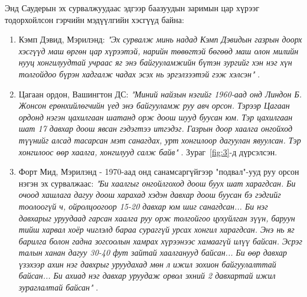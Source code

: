 \documentclass[10pt,twocolumn,letterpaper]{article}
\begin{document}
Энд Саудерын эх сурвалжуудаас эдгээр баазуудын заримын цар хүрээг тодорхойлсон гэрчийн мэдүүлгийн хэсгүүд байна:
\begin{flushleft}
\begin{enumerate}
    \item Кэмп Дэвид, Мэрилэнд: \textit{"Эх сурвалж минь надад Кэмп Дэвидын газрын доорх хэсгүүд маш өргөн цар хүрээтэй, нарийн төвөгтэй бөгөөд маш олон милийн нууц хонгилуудтай учраас яг энэ байгууламжийн бүтэн зургийг хэн нэг хүн толгойдоо бүрэн хадгалж чадах эсэх нь эргэлзээтэй гэж хэлсэн"} \cite{22}.
    \item Цагаан ордон, Вашингтон ДС: \textit{"Миний найзын нэгийг 1960-аад онд Линдон Б. Жонсон ерөнхийлөгчийн үед энэ байгууламж руу авч орсон. Тэрээр Цагаан ордонд нэгэн цахилгаан шатанд орж доош шууд буусан юм. Тэр цахилгаан шат 17 давхар доош явсан гэдэгтээ итгэдэг. Газрын доор хаалга онгойход түүнийг алсад тасарсан мэт санагдах, урт хонгилоор дагуулан явуулсан. Тэр хонгилоос өөр хаалга, хонгилууд салж байв"} \cite{22}. Зураг~\ref{fig:3}-д дүрсэлсэн.
    \item Форт Мид, Мэрилэнд - 1970-аад онд санамсаргүйгээр "подвал"-ууд руу орсон нэгэн эх сурвалжаас: \textit{"Би хаалгыг онгойлгоход доош буух шат харагдсан. Би очоод хашлага дагуу доош харахад хэдэн давхар доош буусан бэ гэдгийг тоолоогүй ч, ойролцоогоор 15-20 давхар юм шиг санагдсан... Би нэг давхарыг уруудаад гарсан хаалга руу орж толгойгоо цухуйлган зүүн, баруун тийш харвал хоёр чиглэлд бараа сураггүй урсах хонгил харагдсан. Энэ нь яг барилга болон гадна зогсоолын хамрах хүрээнээс хамаагүй илүү байсан. Эсрэг талын ханан дагуу 30-40 фут зайтай хаалганууд байсан... Би өөр давхар үзэхээр ахин нэг давхрыг уруудахад мөн л ижил зохион байгуулалттай байсан... Би ахиад нэг давхар уруудаж орвол эхний 2 давхартай ижил зураглалтай байсан"} \cite{22}.
\end{enumerate}
\end{flushleft}
\end{document}
